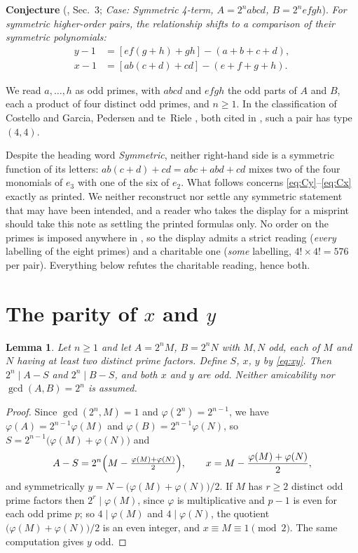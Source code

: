 \documentclass[11pt]{amsart}
\newtheorem{lemma}[theorem]{Lemma}
\theoremstyle{remark}
\begin{document}
\medskip
\noindent\textbf{Conjecture} (\cite{MA}, Sec.~3; \emph{Case: Symmetric 4-term,
$A=2^nabcd$, $B=2^nefgh$}).
\emph{For symmetric higher-order pairs, the relationship shifts to a comparison
of their symmetric polynomials:}
\begin{align}
 y-1&=[ef(g+h)+gh]-(a+b+c+d), \label{eq:Cy}\\
 x-1&=[ab(c+d)+cd]-(e+f+g+h). \label{eq:Cx}
\end{align}

\medskip
We read $a,\dots,h$ as odd primes, with $abcd$ and $efgh$ the odd parts of $A$
and $B$, each a product of four distinct odd primes, and $n\ge1$. In the
classification of Costello \cite{Costello} and Garcia, Pedersen and te~Riele
\cite{GPtR}, both cited in \cite{MA}, such a pair has type $(4,4)$.

Despite the heading word \emph{Symmetric}, neither right-hand side is a
symmetric function of its letters: $ab(c+d)+cd=abc+abd+cd$ mixes two of the four
monomials of $e_3$ with one of the six of $e_2$. What follows concerns
\eqref{eq:Cy}--\eqref{eq:Cx} exactly as printed. We neither reconstruct nor
settle any symmetric statement that may have been intended, and a reader who
takes the display for a misprint should take this note as settling the printed
formulas only. No order on the primes is imposed anywhere in \cite{MA}, so the
display admits a strict reading (\emph{every} labelling of the eight primes) and
a charitable one (\emph{some} labelling, $4!\times4!=576$ per pair). Everything
below refutes the charitable reading, hence both.

\section{The parity of $x$ and $y$}

\begin{lemma}\label{lem:parity}
Let $n\ge1$ and let $A=2^nM$, $B=2^nN$ with $M,N$ odd, each of $M$ and $N$
having at least two distinct prime factors. Define $S$, $x$, $y$ by
\eqref{eq:xy}. Then $2^n\mid A-S$ and $2^n\mid B-S$, and both $x$ and $y$ are
odd. Neither amicability nor $\gcd(A,B)=2^n$ is assumed.
\end{lemma}

\begin{proof}
Since $\gcd(2^n,M)=1$ and $\varphi(2^n)=2^{n-1}$, we have
$\varphi(A)=2^{n-1}\varphi(M)$ and $\varphi(B)=2^{n-1}\varphi(N)$, so
$S=2^{n-1}\bigl(\varphi(M)+\varphi(N)\bigr)$ and
\begin{equation}\label{eq:xred}
 A-S=2^n\Bigl(M-\tfrac{\varphi(M)+\varphi(N)}{2}\Bigr),
 \qquad
 x=M-\frac{\varphi(M)+\varphi(N)}{2},
\end{equation}
and symmetrically $y=N-\bigl(\varphi(M)+\varphi(N)\bigr)/2$. If $M$ has $r\ge2$
distinct odd prime factors then $2^r\mid\varphi(M)$, since $\varphi$ is
multiplicative and $p-1$ is even for each odd prime $p$; so $4\mid\varphi(M)$
and $4\mid\varphi(N)$, the quotient $\bigl(\varphi(M)+\varphi(N)\bigr)/2$ is an
even integer, and $x\equiv M\equiv1\pmod2$. The same computation gives $y$ odd.
\end{proof}
\end{document}
